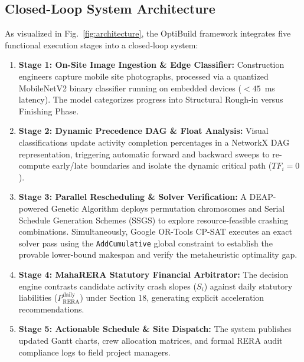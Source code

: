 \documentclass[conference]{IEEEtran}
\begin{document}
\subsection{Closed-Loop System Architecture}
As visualized in Fig.~\ref{fig:architecture}, the OptiBuild framework integrates five functional execution stages into a closed-loop system:
\begin{enumerate}
    \item \textbf{Stage 1: On-Site Image Ingestion \& Edge Classifier:} Construction engineers capture mobile site photographs, processed via a quantized MobileNetV2 binary classifier running on embedded devices ($<45$~ms latency). The model categorizes progress into Structural Rough-in versus Finishing Phase.
    \item \textbf{Stage 2: Dynamic Precedence DAG \& Float Analysis:} Visual classifications update activity completion percentages in a NetworkX DAG representation, triggering automatic forward and backward sweeps to re-compute early/late boundaries and isolate the dynamic critical path ($TF_i = 0$).
    \item \textbf{Stage 3: Parallel Rescheduling \& Solver Verification:} A DEAP-powered Genetic Algorithm deploys permutation chromosomes and Serial Schedule Generation Schemes (SSGS) to explore resource-feasible crashing combinations. Simultaneously, Google OR-Tools CP-SAT executes an exact solver pass using the \texttt{AddCumulative} global constraint to establish the provable lower-bound makespan and verify the metaheuristic optimality gap.
    \item \textbf{Stage 4: MahaRERA Statutory Financial Arbitrator:} The decision engine contrasts candidate activity crash slopes ($S_i$) against daily statutory liabilities ($P_{\text{RERA}}^{\text{daily}}$) under Section 18, generating explicit acceleration recommendations.
    \item \textbf{Stage 5: Actionable Schedule \& Site Dispatch:} The system publishes updated Gantt charts, crew allocation matrices, and formal RERA audit compliance logs to field project managers.
\end{enumerate}
\end{document}
